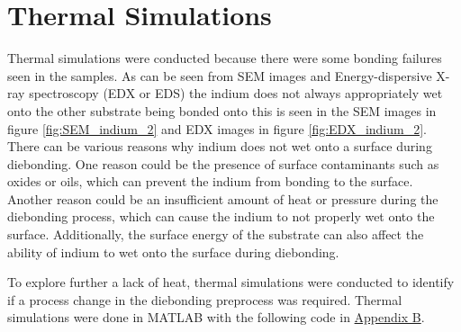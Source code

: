 
\section{Thermal Simulations}

Thermal simulations were conducted because there were some bonding failures seen in the samples. As can be seen from SEM images and Energy-dispersive X-ray spectroscopy (EDX or EDS) the indium does not always appropriately wet onto the other substrate being bonded onto this is seen in the SEM images in figure
\ref{fig:SEM_indium_2} and EDX images in figure \ref{fig:EDX_indium_2}.
There can be various reasons why indium does not wet onto a surface during diebonding. One reason could be the presence of surface contaminants such as oxides or oils, which can prevent the indium from bonding to the surface. Another reason could be an insufficient amount of heat or pressure during the diebonding process, which can cause the indium to not properly wet onto the surface. Additionally, the surface energy of the substrate can also affect the ability of indium to wet onto the surface during diebonding.

To explore further a lack of heat, thermal simulations were conducted to identify if a process change in the diebonding preprocess was required. Thermal simulations were done in MATLAB with the following code in
\hyperref[sec:ThermalSimulationCode]{Appendix B}.

